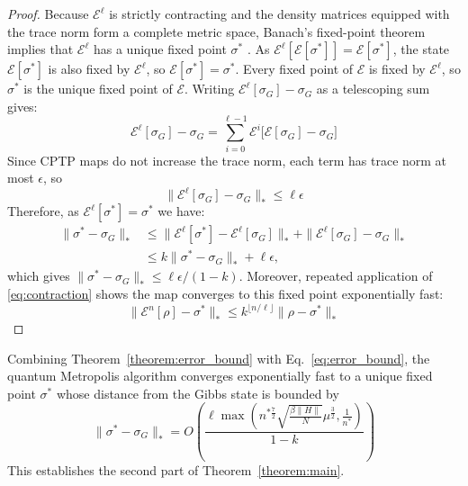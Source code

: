  \begin{proof}
Because $\mathcal{E}^{\ell}$ is strictly contracting and the density matrices equipped with the trace norm form a complete metric space, Banach's fixed-point theorem implies that $\mathcal{E}^{\ell}$ has a unique fixed point $\sigma^*$ \cite{Mart_nez_Pe_a_2023,Raginsky_2002}. As $\mathcal{E}^{\ell}[\mathcal{E}[\sigma^*]]=\mathcal{E}[\sigma^*]$, the state $\mathcal{E}[\sigma^*]$ is also fixed by $\mathcal{E}^{\ell}$, so $\mathcal{E}[\sigma^*]=\sigma^*$. Every fixed point of $\mathcal{E}$ is fixed by $\mathcal{E}^{\ell}$, so $\sigma^*$ is the unique fixed point of $\mathcal{E}$. Writing $\mathcal{E}^{\ell}[\sigma_G]-\sigma_G$ as a telescoping sum gives:
\begin{equation}
    \mathcal{E}^{\ell}[\sigma_G]-\sigma_G=\sum_{i=0}^{\ell-1}\mathcal{E}^{i}\big[\mathcal{E}[\sigma_G]-\sigma_G\big]
\end{equation}
Since CPTP maps do not increase the trace norm, each term has trace norm at most $\epsilon$, so
\begin{equation}
   \|\mathcal{E}^{\ell}[\sigma_G]-\sigma_G\|_*\leq\ell\epsilon
\end{equation}
Therefore, as $\mathcal{E}^{\ell}[\sigma^*]=\sigma^*$ we have:
\begin{align}
 \|\sigma^*-\sigma_G\|_*
 &\leq \|\mathcal{E}^{\ell}[\sigma^*]-\mathcal{E}^{\ell}[\sigma_G]\|_*+\|\mathcal{E}^{\ell}[\sigma_G]-\sigma_G\|_*\\
 &\leq k\|\sigma^*-\sigma_G\|_*+\ell\epsilon,
\end{align}
which gives $\|\sigma^*-\sigma_G\|_*\leq\ell\epsilon/(1-k)$. Moreover, repeated application of \eqref{eq:contraction} shows the map converges to this fixed point exponentially fast:
\begin{equation}
     \|\mathcal{E}^n[\rho] -\sigma^*\|_* \leq k^{\lfloor n/\ell\rfloor}\| \rho - \sigma^*\|_*
\end{equation}
 \end{proof}
 
Combining Theorem~\ref{theorem:error_bound} with Eq.~\eqref{eq:error_bound}, the quantum Metropolis algorithm converges exponentially fast to a unique fixed point $\sigma^*$ whose distance from the Gibbs state is bounded by
\begin{equation}
    \|\sigma^*-\sigma_G\|_* =
    O\left(\frac{\ell\max\left( n^{*\frac{7}{2}}\sqrt{\frac{\beta\|H\| }{N}}\mu^{\frac{3}{2}},\frac{1}{n^*}\right)}{1-k}\right)
\end{equation}
This establishes the second part of Theorem~\ref{theorem:main}.
 
